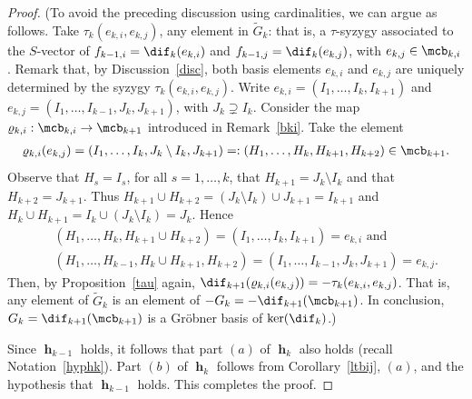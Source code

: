 \begin{proof}
(To avoid the preceding discussion using cardinalities, we can argue
as follows. Take $\tau_{k}(e_{k,i},e_{k,j})$, any element in
$\tilde{G}_k$: that is, a $\tau$-syzygy associated to the $S$-vector
of $f_{k-1,i}=\dif_k(e_{k,i})$ and $f_{k-1,j}=\dif_{k}(e_{k,j})$, with
$e_{k,j}\in\mcb_{k,i}$. Remark that, by Discussion~\ref{disc}, both
basis elements $e_{k,i}$ and $e_{k,j}$ are uniquely determined by the
syzygy $\tau_k(e_{k,i},e_{k,j})$. Write $e_{k,i}=(I_1,\ldots
,I_{k},I_{k+1})$ and $e_{k,j}=(I_1,\ldots ,I_{k-1},J_{k},J_{k+1})$,
with $J_{k}\supsetneq I_{k}$. Consider the map
$\varrho_{k,i}:\mcb_{k,i}\to \mcb_{k+1}$ introduced in
Remark~\ref{bki}. Take the element
\begin{eqnarray*}
\varrho_{k,i}(e_{k,j})=(I_1,\ldots,I_{k},J_{k}\setminus
I_{k},J_{k+1})=:(H_1,\ldots,H_k,H_{k+1},H_{k+2})\in\mcb_{k+1}.
\end{eqnarray*}
Observe that $H_s=I_s$, for all $s=1,\ldots ,k$, that
$H_{k+1}=J_{k}\setminus I_{k}$ and that $H_{k+2}=J_{k+1}$. Thus
$H_{k+1}\cup H_{k+2}=(J_{k}\setminus I_{k})\cup J_{k+1}=I_{k+1}$ and
$H_{k}\cup H_{k+1}=I_{k}\cup (J_{k}\setminus I_{k})=J_{k}$. Hence
\begin{eqnarray*}
&& (H_1,\ldots ,H_{k},H_{k+1}\cup H_{k+2})=(I_1,\ldots
  ,I_{k},I_{k+1})=e_{k,i}\mbox{ and }\\ && (H_1,\ldots
  ,H_{k-1},H_{k}\cup H_{k+1},H_{k+2})=(I_1,\ldots
  ,I_{k-1},J_{k},J_{k+1})=e_{k,j}.
\end{eqnarray*}
Then, by Proposition~\ref{tau} again,
$\dif_{k+1}(\varrho_{k,i}(e_{k,j}))=-\tau_{k}(e_{k,i},e_{k,j})$. That
is, any element of $\tilde{G}_k$ is an element of
$-G_{k}=-\dif_{k+1}(\mcb_{k+1})$. In conclusion,
$G_{k}=\dif_{k+1}(\mcb_{k+1})$ is a Gr\"obner basis of
$\ker(\dif_{k})$.)

Since $\mbfh_{k-1}$ holds, it follows that part $(a)$ of
$\mbfh_k$ also holds (recall Notation~\ref{hyphk}). Part $(b)$ of
$\mbfh_k$ follows from Corollary~\ref{ltbij}, $(a)$, and the
hypothesis that $\mbfh_{k-1}$ holds. This completes the proof.
\end{proof}
